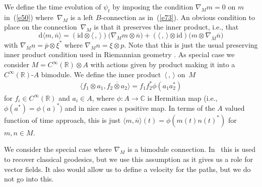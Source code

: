 \documentclass[pdftex]{sigma}
\numberwithin{equation}{section}
\newcommand{\id}{\mathrm{id}}
\newcommand{\extd}{\mathrm{d}}
\newcommand{\tens}{\mathop{\otimes}}
\newcommand{\R}{\mathbb{R}}
\newcommand{\C}{\mathbb{C}}
\newcommand{\<}{\langle}
\renewcommand{\>}{\rangle}
\begin{document}
We define the time evolution of $ \psi_t $ by imposing the condition $ \nabla _{M}m=0 $ on $ m $ in~(\ref{e50}) where~$ \nabla_{M} $ is a left $ B $-connection as in~(\ref{e73}). An obvious condition to place on the connection~$ \nabla_{M} $ is that it preserves the inner product, i.e., that
\begin{equation*}
\extd \langle m, \overline{n}\rangle= (\id \tens \langle\,,\,\rangle)\big(\nabla_{M} m \tens \overline{n}\big)+ (\langle\,,\,\rangle \tens \id)\big(m\tens \nabla_{\overline{M}} \overline{n}\big)
\end{equation*}
with $ \nabla_{\overline{M}} n=\overline{p} \tens \xi^{\ast}$ where $ \nabla_{M} n=\xi \tens p$. Note that this is just the usual preserving inner product condition used in Riemannian geometry \cite{BMbook}. As special case we consider $ M= C^{\infty}(\R) \tens A $ with actions given by product making it into a $ C^{\infty}(\R) $-$ A $ bimodule. We define the inner product~$ \langle\,,\,\rangle $ on~$ M $
\begin{align*}
	\< f_{1} \tens a_{1}, \overline{f_{2} \tens a_{2}} \>= f_{1} f_{2}^{*} \phi (a_{1}a_{2}^{*})
\end{align*}
for $ f_{i} \in C^{\infty }(\R) $ and $ a_{i} \in A $, where $ \phi\colon A\rightarrow \C $ is Hermitian map (i.e., $ \phi(a^{*})=\phi(a)^{*} $) and in nice cases a positive map. In terms of the $ A $ valued function of time approach, this is just $ \< m, \overline{n}\>(t)=\phi (m(t) n(t)^{*}) $ for $ m,n\in M $.

We consider the special case where $ \nabla_{M} $ is a bimodule connection. In~\cite{Bgeo} this is used to recover classical geodesics, but we use this assumption as it gives us a role for vector fields. It also would allow us to define a velocity for the paths, but we do not go into this.
\end{document}
